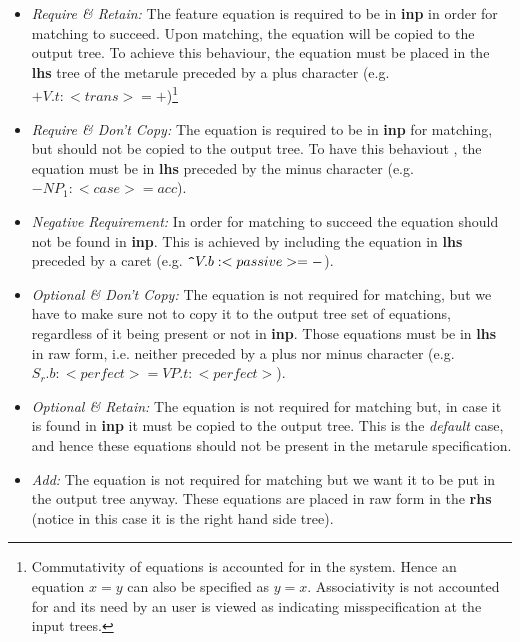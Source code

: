 \begin{itemize}
\item   {\it Require \& Retain:} The feature equation
        is required to be in {\bf inp} in order for matching to succeed.
        Upon matching, the equation will be copied to the output tree.
        To achieve this behaviour, the equation must be placed in 
        the {\bf lhs} tree of the metarule preceded by a plus character
        (e.g. $+V.t:<trans>=+$)\footnote{Commutativity of equations is 
        accounted for in the system. Hence an equation $x=y$ can also be
        specified as $y=x$. Associativity is not accounted for and its need by
        an user is viewed as indicating misspecification at the input trees.}
        
\item   {\it Require \& Don't Copy:} The equation is required to be in 
        {\bf inp}
        for matching, but should not be copied to the output tree.
        To have this behaviout , the equation must be in {\bf lhs} preceded 
	by the minus character
        (e.g. $-NP_1:<case>=acc$).

\item	{\it Negative Requirement:} In order for matching to succeed the 
	equation should not be found in {\bf inp}. This is achieved by
	including the equation in {\bf lhs} preceded by a caret
	(e.g. $\verb|^|V.b:<passive>=-$).

\item   {\it Optional \& Don't Copy:} 
        The equation is not required for matching,
        but we have to make sure not to copy it to the output tree set of
        equations, regardless of it being present or not in {\bf inp}.
        Those equations must be in {\bf lhs} in raw form, i.e. neither preceded
        by a plus nor minus character
        (e.g. $S_r.b:<perfect>=VP.t:<perfect>$).

\item   {\it Optional \& Retain:} 
        The equation is not required for matching but,
        in case it is found in {\bf inp} it must be copied to the output tree.
        This is the {\it default} case, and hence these equations should not be
        present in the metarule specification.

\item   {\it Add:} The equation is not required for matching but we want it to
        be put in the output tree anyway.
        These equations are placed in raw form in the {\bf rhs} (notice in this
        case it is the right hand side tree).
\end{itemize}


